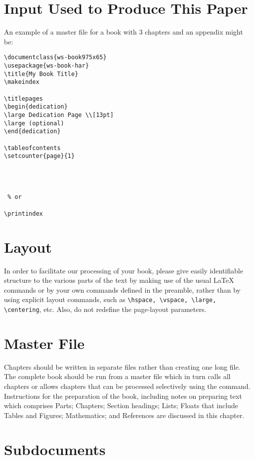 \section{Input Used to Produce This Paper}
An example of a master file for a book with 3 chapters and an
appendix might be:

\begin{verbatim}
\documentclass{ws-book975x65}
\usepackage{ws-book-har}
\title{My Book Title}
\makeindex

\titlepages
\begin{dedication}
\large Dedication Page \\[13pt]
\large (optional)
\end{dedication}

\tableofcontents
\setcounter{page}{1}




 % or 

\printindex

\end{verbatim}

\section{Layout}
In order to facilitate our processing of your book, please give
easily identifiable structure to the various parts of the text by
making use of the usual \LaTeX{} commands or by your own commands
defined in the preamble, rather than by using explicit layout
commands, such as \verb|\hspace, \vspace, \large, \centering|, etc.
Also, do not redefine the page-layout parameters.

\section{Master File}
Chapters should be written in separate files rather than creating
one long file. The complete book should be run from a master
file which in turn calls all chapters or allows
chapters that can be processed selectively using the \verb||
command. Instructions for the preparation of the book, including
notes on preparing text which comprises Parts; Chapters; Section
headings; Lists; Floats that include Tables and Figures;
Mathematics; and References are discussed in this chapter.

\section{Subdocuments}
